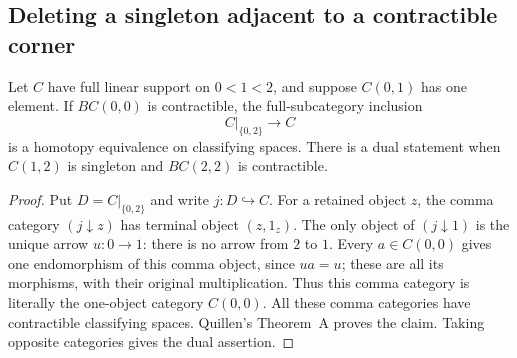 \subsection{Deleting a singleton adjacent to a contractible corner}

\begin{lemma}
\label{CP2:A-linear-contractible-singleton}
Let $C$ have full linear support on $0<1<2$, and suppose
$C(0,1)$ has one element.  If $BC(0,0)$ is contractible,
the full-subcategory inclusion
\[
 C|_{\{0,2\}}\longrightarrow C
\]
is a homotopy equivalence on classifying spaces.
There is a dual statement when $C(1,2)$ is singleton and
$BC(2,2)$ is contractible.
\end{lemma}
\begin{proof}
Put $D=C|_{\{0,2\}}$ and write $j:D\hookrightarrow C$.
For a retained object $z$, the comma category $(j\downarrow z)$
has terminal object $(z,1_z)$.  The only object of
$(j\downarrow1)$ is the unique arrow $u:0\to1$: there is
no arrow from $2$ to $1$.  Every $a\in C(0,0)$ gives one
endomorphism of this comma object, since $ua=u$; these are all
its morphisms, with their original multiplication.  Thus this
comma category is literally the one-object category $C(0,0)$.
All these comma categories have contractible classifying spaces.
Quillen's Theorem~A proves the claim.  Taking opposite categories
gives the dual assertion.
\end{proof}

